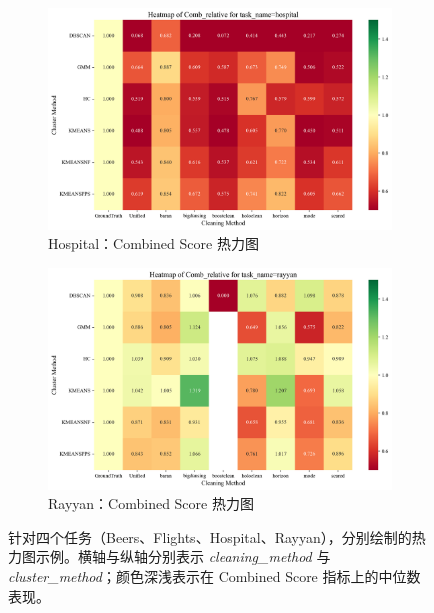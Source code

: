 \documentclass[10pt]{article} %
\numberwithin{equation}{section}
\begin{document}
\begin{enumerate}[label=(\alph*)]
\begin{figure}[htbp]
    \vspace{1em} %

    \begin{subfigure}[b]{0.45\linewidth}
        \centering
        \includegraphics[width=\linewidth]{figures/heatmap/heatmap_hospital_Comb_relative.png}
        \caption{Hospital：Combined Score 热力图}
        \label{fig:heatmap_hospital}
    \end{subfigure}
    \hfill
    \begin{subfigure}[b]{0.45\linewidth}
        \centering
        \includegraphics[width=\linewidth]{figures/heatmap/heatmap_rayyan_Comb_relative.png}
        \caption{Rayyan：Combined Score 热力图}
        \label{fig:heatmap_rayyan}
    \end{subfigure}

    \caption{针对四个任务（Beers、Flights、Hospital、Rayyan），分别绘制的热力图示例。横轴与纵轴分别表示 \textit{cleaning\_method} 与 \textit{cluster\_method}；颜色深浅表示在 Combined Score 指标上的中位数表现。}
    \label{fig:all_heatmaps}
\end{figure}


\end{enumerate}
\end{document}
